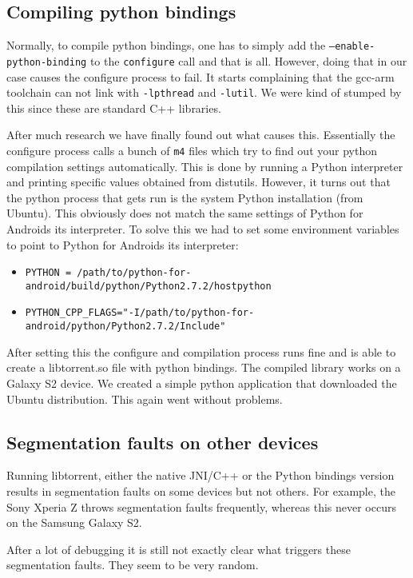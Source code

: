 		\subsection{Compiling python bindings}
			Normally, to compile python bindings, one has to simply add the \texttt{--enable-python-binding} to the \texttt{configure} call and that is all. However, doing that in our case causes the configure process to fail. It starts complaining that the gcc-arm toolchain can not link with \texttt{-lpthread} and \texttt{-lutil}. We were kind of stumped by this since these are standard C++ libraries.
			
			After much research we have finally found out what causes this. Essentially the configure process calls a bunch of \texttt{m4} files which try to find out your python compilation settings automatically. This is done by running a Python interpreter and printing specific values obtained from distutils. However, it turns out that the python process that gets run is the system Python installation (from Ubuntu). This obviously does not match the same settings of Python for Androids its interpreter. To solve this we had to set some environment variables to point to Python for Androids its interpreter:
			
			\begin{itemize}
				\item \texttt{PYTHON = /path/to/python-for-android/build/python/Python2.7.2/hostpython}
				\item \texttt{PYTHON\_CPP\_FLAGS="-I/path/to/python-for-android/python/Python2.7.2/Include"}
			\end{itemize}
			
			After setting this the configure and compilation process runs fine and is able to create a libtorrent.so file with python bindings. The compiled library works on a Galaxy S2 device. We created a simple python application that downloaded the Ubuntu distribution. This again went without problems.
			
		\subsection{Segmentation faults on other devices}
			Running libtorrent, either the native JNI/C++ or the Python bindings version results in segmentation faults on some devices but not others. For example, the Sony Xperia Z throws segmentation faults frequently, whereas this never occurs on the Samsung Galaxy S2. 
			
			After a lot of debugging it is still not exactly clear what triggers these segmentation faults. They seem to be very random.
			
